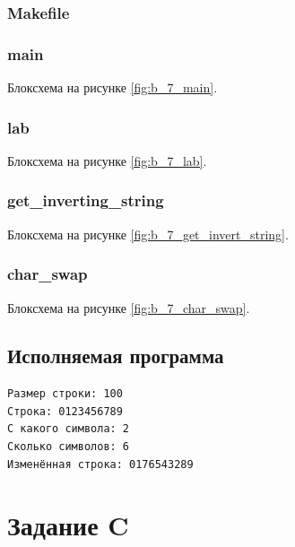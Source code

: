 \documentclass[12pt, a4paper]{article}
\begin{document}
\subsubsection{Makefile}


\subsubsection{main}
Блоксхема на рисунке \ref{fig:b_7_main}.



\subsubsection{lab}
Блоксхема на рисунке \ref{fig:b_7_lab}.



\subsubsection{get\_inverting\_string}
Блоксхема на рисунке \ref{fig:b_7_get_invert_string}.



\subsubsection{char\_swap}
Блоксхема на рисунке \ref{fig:b_7_char_swap}.



\subsection{Исполняемая программа}

\begin{verbatim}
Размер строки: 100
Строка: 0123456789
С какого символа: 2
Сколько символов: 6
Изменённая строка: 0176543289
\end{verbatim}

\labconclusion{}

\newpage

\section{Задание C}
\end{document}
